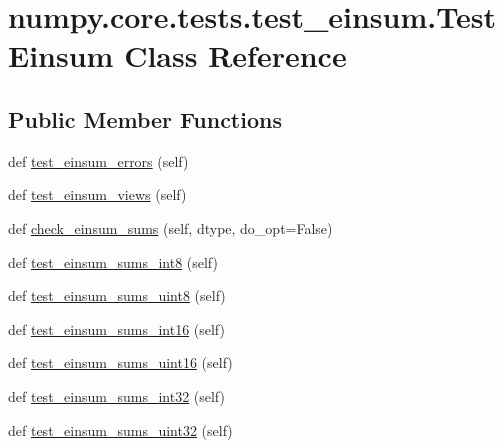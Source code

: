 \hypertarget{classnumpy_1_1core_1_1tests_1_1test__einsum_1_1TestEinsum}{}\section{numpy.\+core.\+tests.\+test\+\_\+einsum.\+Test\+Einsum Class Reference}
\label{classnumpy_1_1core_1_1tests_1_1test__einsum_1_1TestEinsum}
\subsection*{Public Member Functions}
\begin{DoxyCompactItemize}
\item 
def \hyperlink{classnumpy_1_1core_1_1tests_1_1test__einsum_1_1TestEinsum_ab1e7a74da5e8e5dbd4cbfdceb175b090}{test\+\_\+einsum\+\_\+errors} (self)
\item 
def \hyperlink{classnumpy_1_1core_1_1tests_1_1test__einsum_1_1TestEinsum_a635a2217e571a1c2a0e7158adb3d7021}{test\+\_\+einsum\+\_\+views} (self)
\item 
def \hyperlink{classnumpy_1_1core_1_1tests_1_1test__einsum_1_1TestEinsum_a00a512085bb380792a01cc8f697d56e3}{check\+\_\+einsum\+\_\+sums} (self, dtype, do\+\_\+opt=False)
\item 
def \hyperlink{classnumpy_1_1core_1_1tests_1_1test__einsum_1_1TestEinsum_a9903010b035b665e3627e936ced678f9}{test\+\_\+einsum\+\_\+sums\+\_\+int8} (self)
\item 
def \hyperlink{classnumpy_1_1core_1_1tests_1_1test__einsum_1_1TestEinsum_a7c5793621a2c9791e80f52378dd4dac8}{test\+\_\+einsum\+\_\+sums\+\_\+uint8} (self)
\item 
def \hyperlink{classnumpy_1_1core_1_1tests_1_1test__einsum_1_1TestEinsum_ac511f9b013e472c03320810bb06e9e32}{test\+\_\+einsum\+\_\+sums\+\_\+int16} (self)
\item 
def \hyperlink{classnumpy_1_1core_1_1tests_1_1test__einsum_1_1TestEinsum_a510c703acf6deeb829eb72a5103d01c8}{test\+\_\+einsum\+\_\+sums\+\_\+uint16} (self)
\item 
def \hyperlink{classnumpy_1_1core_1_1tests_1_1test__einsum_1_1TestEinsum_a45a935ddffdbd608e30ce3ebbf7be485}{test\+\_\+einsum\+\_\+sums\+\_\+int32} (self)
\item 
def \hyperlink{classnumpy_1_1core_1_1tests_1_1test__einsum_1_1TestEinsum_a9c231e29b87a70fc46e53b559dead62f}{test\+\_\+einsum\+\_\+sums\+\_\+uint32} (self)
\item 

\end{DoxyCompactItemize}
